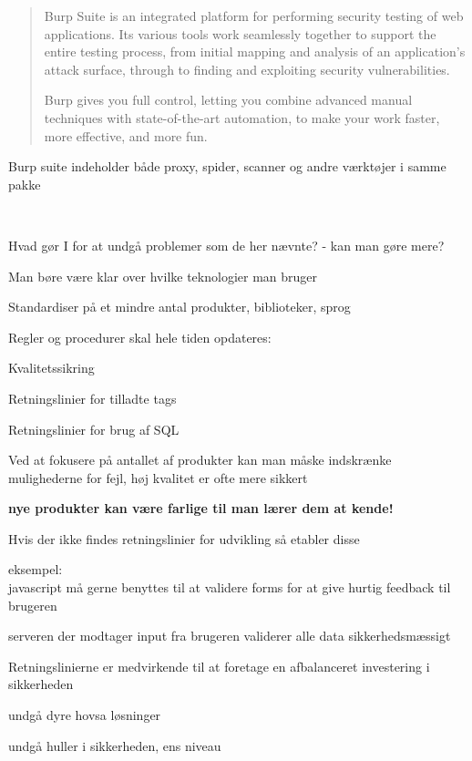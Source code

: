 \documentclass[Screen16to9,17pt]{foils}
\begin{document}
\begin{list2}

\begin{quote}
Burp Suite is an integrated platform for performing security testing of web applications. Its various tools work seamlessly together to support the entire testing process, from initial mapping and analysis of an application's attack surface, through to finding and exploiting security vulnerabilities.

Burp gives you full control, letting you combine advanced manual techniques with state-of-the-art automation, to make your work faster, more effective, and more fun.
\end{quote}

Burp suite indeholder både proxy, spider, scanner og andre værktøjer i samme pakke

\\



\begin{list1}
\item Hvad gør I for at undgå problemer som de her nævnte?
- kan man gøre mere?
\item Man børe være klar over hvilke teknologier man bruger
\item Standardiser på et mindre antal produkter, biblioteker, sprog
\item Regler og procedurer skal hele tiden opdateres:
\begin{list2}
\item Kvalitetssikring
\item Retningslinier for tilladte tags
\item Retningslinier for brug af SQL
\end{list2}

\item Ved at fokusere på antallet af produkter kan man måske
  indskrænke mulighederne for fejl, høj kvalitet er ofte mere sikkert

\item {\bf nye produkter kan være farlige til man lærer dem at kende!}
\end{list1}


\begin{list2}
\item Hvis der ikke findes retningslinier for udvikling så etabler disse
\item eksempel:\\
javascript må gerne benyttes til at validere forms for at give hurtig
feedback til brugeren
\item serveren der modtager input fra brugeren validerer alle data
  sikkerhedsmæssigt
\item Retningslinierne er medvirkende til at foretage
en afbalanceret investering i sikkerheden
\item undgå dyre hovsa løsninger
\item undgå huller i sikkerheden, ens niveau


\end{list2}
\end{list2}
\end{document}
